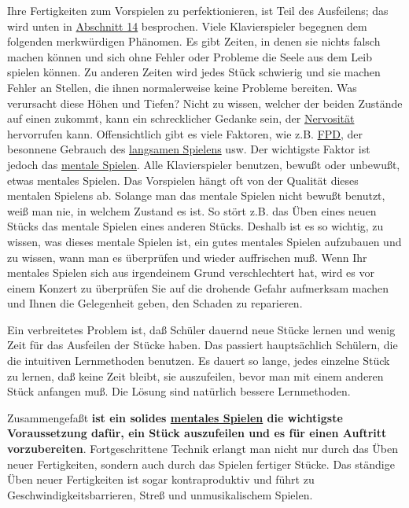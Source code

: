 Ihre Fertigkeiten zum Vorspielen zu perfektionieren, ist Teil des Ausfeilens; das wird unten in \hyperref[c1iii14]{Abschnitt 14} besprochen.
Viele Klavierspieler begegnen dem folgenden merkwürdigen Phänomen.
Es gibt Zeiten, in denen sie nichts falsch machen können und sich ohne Fehler oder Probleme die Seele aus dem Leib spielen können.
Zu anderen Zeiten wird jedes Stück schwierig und sie machen Fehler an Stellen, die ihnen normalerweise keine Probleme bereiten.
Was verursacht diese Höhen und Tiefen?
Nicht zu wissen, welcher der beiden Zustände auf einen zukommt, kann ein schrecklicher Gedanke sein, der \hyperref[c1iii15]{Nervosität} hervorrufen kann.
Offensichtlich gibt es viele Faktoren, wie z.B. \hyperref[fpd]{FPD}, der besonnene Gebrauch des \hyperref[c1ii17]{langsamen Spielens} usw.
Der wichtigste Faktor ist jedoch das \hyperref[c1ii12]{mentale Spielen}.
Alle Klavierspieler benutzen, bewußt oder unbewußt, etwas mentales Spielen.
Das Vorspielen hängt oft von der Qualität dieses mentalen Spielens ab.
Solange man das mentale Spielen nicht bewußt benutzt, weiß man nie, in welchem Zustand es ist.
So stört z.B. das Üben eines neuen Stücks das mentale Spielen eines anderen Stücks.
Deshalb ist es so wichtig, zu wissen, was dieses mentale Spielen ist, ein gutes mentales Spielen aufzubauen und zu wissen, wann man es überprüfen und wieder auffrischen muß.
Wenn Ihr mentales Spielen sich aus irgendeinem Grund verschlechtert hat, wird es vor einem Konzert zu überprüfen Sie auf die drohende Gefahr aufmerksam machen und Ihnen die Gelegenheit geben, den Schaden zu reparieren.

Ein verbreitetes Problem ist, daß Schüler dauernd neue Stücke lernen und wenig Zeit für das Ausfeilen der Stücke haben.
Das passiert hauptsächlich Schülern, die die intuitiven Lernmethoden benutzen.
Es dauert so lange, jedes einzelne Stück zu lernen, daß keine Zeit bleibt, sie auszufeilen, bevor man mit einem anderen Stück anfangen muß.
Die Lösung sind natürlich bessere Lernmethoden.
 
Zusammengefaßt \textbf{ist ein solides \hyperref[c1ii12]{mentales Spielen} die wichtigste Voraussetzung dafür, ein Stück auszufeilen und es für einen Auftritt vorzubereiten}.
Fortgeschrittene Technik erlangt man nicht nur durch das Üben neuer Fertigkeiten, sondern auch durch das Spielen fertiger Stücke.
Das ständige Üben neuer Fertigkeiten ist sogar kontraproduktiv und führt zu Geschwindigkeitsbarrieren, Streß und unmusikalischem Spielen.
 


